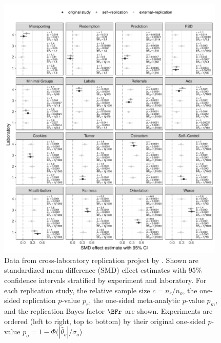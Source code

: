 \begin{figure}[!htb]
\begin{knitrout}
\color{fgcolor}
\includegraphics[width=0.97\textwidth]{images/paper3/analysis-protzko-1}
\end{knitrout}
\caption{Data from cross-laboratory replication project by \citet{Protzko2020}.
  Shown are standardized mean difference (SMD) effect estimates with 95\%
  confidence intervals stratified by experiment and laboratory. For each
  replication study, the relative sample size $c = n_{r}/n_{o}$, the one-sided
  replication $p$-value $p_{r}$, the one-sided meta-analytic $p$-value $p_{m}$,
  and the replication Bayes factor $\BFr$ are shown. Experiments are ordered
  (left to right, top to bottom) by their original one-sided $p$-value
  $p_{o} = 1 - \Phi(|\hat{\theta}_{o}|/\sigma_{o}$)}
\label{fig3:data}
\end{figure}


